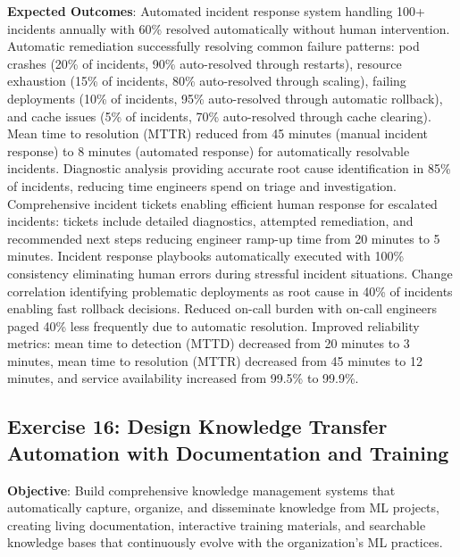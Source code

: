 \textbf{Expected Outcomes}: Automated incident response system handling 100+ incidents annually with 60\% resolved automatically without human intervention. Automatic remediation successfully resolving common failure patterns: pod crashes (20\% of incidents, 90\% auto-resolved through restarts), resource exhaustion (15\% of incidents, 80\% auto-resolved through scaling), failing deployments (10\% of incidents, 95\% auto-resolved through automatic rollback), and cache issues (5\% of incidents, 70\% auto-resolved through cache clearing). Mean time to resolution (MTTR) reduced from 45 minutes (manual incident response) to 8 minutes (automated response) for automatically resolvable incidents. Diagnostic analysis providing accurate root cause identification in 85\% of incidents, reducing time engineers spend on triage and investigation. Comprehensive incident tickets enabling efficient human response for escalated incidents: tickets include detailed diagnostics, attempted remediation, and recommended next steps reducing engineer ramp-up time from 20 minutes to 5 minutes. Incident response playbooks automatically executed with 100\% consistency eliminating human errors during stressful incident situations. Change correlation identifying problematic deployments as root cause in 40\% of incidents enabling fast rollback decisions. Reduced on-call burden with on-call engineers paged 40\% less frequently due to automatic resolution. Improved reliability metrics: mean time to detection (MTTD) decreased from 20 minutes to 3 minutes, mean time to resolution (MTTR) decreased from 45 minutes to 12 minutes, and service availability increased from 99.5\% to 99.9\%.

\subsection{Exercise 16: Design Knowledge Transfer Automation with Documentation and Training}

\textbf{Objective}: Build comprehensive knowledge management systems that automatically capture, organize, and disseminate knowledge from ML projects, creating living documentation, interactive training materials, and searchable knowledge bases that continuously evolve with the organization's ML practices.

